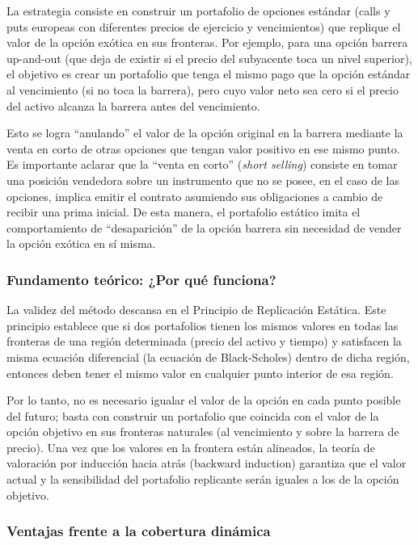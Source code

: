 La estrategia consiste en construir un portafolio de opciones estándar (calls y puts europeas con diferentes precios de ejercicio y vencimientos) que replique el valor de la opción exótica en sus fronteras. Por ejemplo, para una opción barrera up-and-out (que deja de existir si el precio del subyacente toca un nivel superior), el objetivo es crear un portafolio que tenga el mismo pago que la opción estándar al vencimiento (si no toca la barrera), pero cuyo valor neto sea cero si el precio del activo alcanza la barrera antes del vencimiento.

Esto se logra ``anulando'' el valor de la opción original en la barrera mediante la venta en corto de otras opciones que tengan valor positivo en ese mismo punto. Es importante aclarar que la ``venta en corto'' (\textit{short selling}) consiste en tomar una posición vendedora sobre un instrumento que no se posee, en el caso de las opciones, implica emitir el contrato asumiendo sus obligaciones a cambio de recibir una prima inicial. De esta manera, el portafolio estático imita el comportamiento de ``desaparición'' de la opción barrera sin necesidad de vender la opción exótica en sí misma.

\subsubsection*{Fundamento teórico: ¿Por qué funciona?} 

La validez del método descansa en el Principio de Replicación Estática. Este principio establece que si dos portafolios tienen los mismos valores en todas las fronteras de una región determinada (precio del activo y tiempo) y satisfacen la misma ecuación diferencial (la ecuación de Black-Scholes) dentro de dicha región, entonces deben tener el mismo valor en cualquier punto interior de esa región.

Por lo tanto, no es necesario igualar el valor de la opción en cada punto posible del futuro; basta con construir un portafolio que coincida con el valor de la opción objetivo en sus fronteras naturales (al vencimiento y sobre la barrera de precio). Una vez que los valores en la frontera están alineados, la teoría de valoración por inducción hacia atrás (backward induction) garantiza que el valor actual y la sensibilidad del portafolio replicante serán iguales a los de la opción objetivo.

\subsubsection*{Ventajas frente a la cobertura dinámica} 

